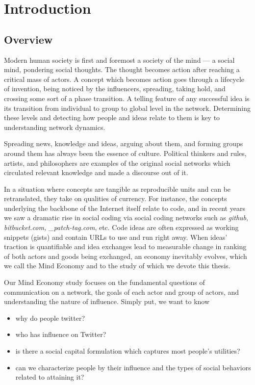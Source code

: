 \documentclass[10pt,oneside]{memoir}
\begin{document}
\chapter{Introduction}
\label{introduction}

\section{Overview}
\label{overview}

Modern human society is first and foremost a society of the mind --- a social mind, pondering social thoughts.  The thought becomes action after reaching a critical mass of actors.   A concept which becomes action goes through a lifecycle of invention, being noticed by the influencers, spreading, taking hold, and crossing some sort of a phase transition.  A telling feature of any successful idea is its transition from individual to group to global level in the network.  Determining these levels and detecting how people and ideas relate to them is key to understanding network dynamics.


Spreading news, knowledge and ideas, arguing about them, and forming groups around them has always been the essence of culture. Political thinkers and rules, artists, and philosophers are examples of the original social networks which circulated relevant knowledge and made a discourse out of it.


In a situation where concepts are tangible as reproducible units and can be retranslated, they take on qualities of currency.  For instance, the concepts underlying the backbone of the Internet itself relate to code, and in recent years we saw a dramatic rise in social coding via social coding networks such as {\itshape github}, {\itshape bitbucket.com, \_patch-tag.com}, etc.  Code ideas are often expressed as working snippets (gists) and contain URLs to use and run right away.
When ideas' traction is quantifiable and idea exchanges lead to measurable change in ranking of both actors and goods being exchanged, an economy inevitably evolves, which we call the Mind Economy and to the study of which we devote this thesis.


Our Mind Economy study focuses on the fundamental questions of communication on a network, the goals of each actor and group of actors, and understanding the nature of influence.  Simply put, we want to know


\begin{itemize}


\item why do people twitter?

\item who has influence on Twitter? 

\item is there a social capital formulation which captures most people's utilities?

\item can we characterize people by their influence and the types of social behaviors related to attaining it?
\end{itemize}
\end{document}
